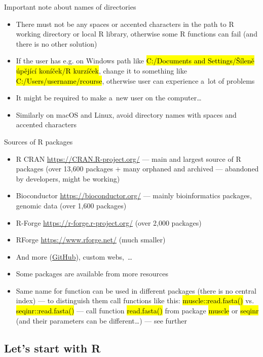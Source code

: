 \documentclass[compress, ucs, xelatex, 11pt, xcolor=svgnames,
	hyperref={
		bookmarks=true,
		unicode=true,
		colorlinks=true,
		pdftitle={Molecular data in R},
		plainpages=false,
		pdfauthor={Vojtech Zeisek},
		pdfsubject={Course about phylogeny and evolution in R},
		pdfcreator={XeLaTeX},
		pdfkeywords={R, evolution, phylogeny, molecular data},
		linkcolor=Tomato,
		anchorcolor=SaddleBrown,
		citecolor=Goldenrod,
		filecolor=DarkMagenta,
		menucolor=Sienna,
		urlcolor=DarkTurquoise,
		pdftex},
	url={hyphens, lowtilde} %
	]{beamer}
\renewcommand{\texttt}[1]{\hl{\ttfamily #1}}
\begin{document}
\begin{frame}{Important note about names of directories}
	\begin{itemize}
		\item \alert{There must not be any spaces or accented characters in the path to R working directory or local R library}, otherwise some R functions can fail (and there is no other solution)
		\item If the user has e.g. on Windows path like \texttt{C:/Documents and Settings/Šíleně úpějící koníček/R kurzíček}, change it to something like \texttt{C:/Users/username/rcourse}, otherwise user can experience a~lot of problems
		\item It might be required to make a~new user on the computer\ldots
		\item Similarly on macOS and Linux, avoid directory names with spaces and accented characters
	\end{itemize}
\end{frame}

\begin{frame}{Sources of R packages}
	\label{sources}
	\begin{itemize}
		\item R CRAN \url{https://CRAN.R-project.org/} --- main and largest source of R packages (over 13,600 packages + many orphaned and archived --- abandoned by developers, might be working)
		\item Bioconductor \url{https://bioconductor.org/} --- mainly bioinformatics packages, genomic data (over 1,600 packages)
		\item R-Forge \url{https://r-forge.r-project.org/} (over 2,000 packages)
		\item RForge \url{https://www.rforge.net/} (much smaller)
		\item And more (\href{https://github.com/}{GitHub}), custom webs,~\ldots
		\item Some packages are available from more resources
		\item Same name for function can be used in different packages (there is no central index) --- to distinguish them call functions like this: \texttt{muscle::read.fasta()} vs. \texttt{seqinr::read.fasta()} --- call function \texttt{read.fasta()} from package \texttt{muscle} \alert{or} \texttt{seqinr} (and their parameters can be different\ldots) --- see further
	\end{itemize}
\end{frame}

\subsection{Let's start with R}
\end{document}
